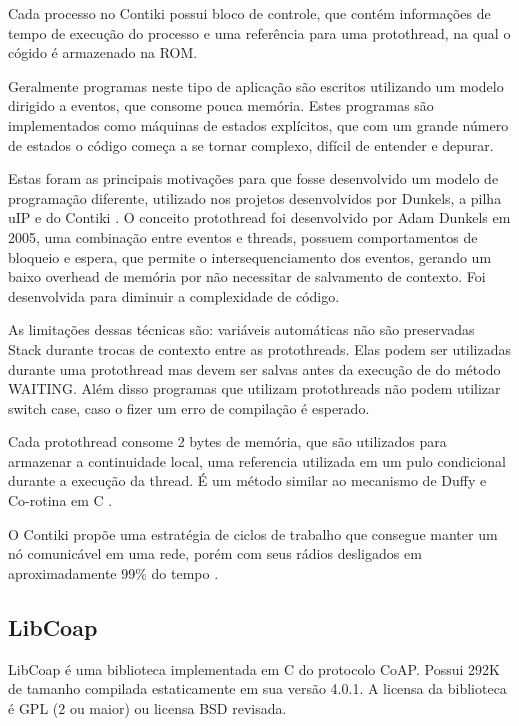 Cada processo no Contiki possui bloco de controle, que cont\'em informa\c{c}\~oes de tempo de execu\c{c}\~ao do processo e uma refer\^encia para uma protothread, na qual o c\'ogido \'e armazenado na ROM. 

Geralmente programas neste tipo de aplica\c{c}\~ao s\~ao escritos utilizando um modelo dirigido a eventos, que consome pouca mem\'oria. Estes programas s\~ao implementados como m\'aquinas de estados expl\'icitos, que com um grande n\'umero de estados o c\'odigo come\c{c}a a se tornar complexo, dif\'icil de entender e depurar.

Estas foram as principais motiva\c{c}\~oes para que fosse desenvolvido um modelo de programa\c{c}\~ao diferente, utilizado nos projetos desenvolvidos por Dunkels, a pilha uIP e do Contiki \cite{Dunkels05protothreads}. O conceito protothread foi desenvolvido por Adam Dunkels em 2005, uma combina\c{c}\~ao entre eventos e threads, possuem comportamentos de bloqueio e espera, que permite o intersequenciamento dos eventos, gerando um baixo overhead de mem\'oria por n\~ao necessitar de salvamento de contexto. Foi desenvolvida para diminuir a complexidade de c\'odigo.

As limita\c{c}\~oes dessas t\'ecnicas s\~ao: vari\'aveis autom\'aticas n\~ao s\~ao preservadas Stack durante trocas de contexto entre as protothreads. Elas podem ser utilizadas durante uma protothread mas devem ser salvas antes da execu\c{c}\~ao de do m\'etodo WAITING. Al\'em disso programas que utilizam protothreads n\~ao podem utilizar switch case, caso o fizer um erro de compila\c{c}\~ao \'e esperado.

Cada protothread consome 2 bytes de mem\'oria, que s\~ao utilizados para armazenar a continuidade local, uma referencia utilizada em um pulo condicional durante a execu\c{c}\~ao da thread. \'E um m\'etodo similar ao mecanismo de Duffy e Co-rotina em C \cite{duffyMechanism}.

O Contiki prop\~oe uma estrat\'egia de ciclos de trabalho que consegue manter um n\'o comunic\'avel em uma rede, por\'em com seus r\'adios desligados em aproximadamente 99\% do tempo \cite{Dunkels11thecontikimac}.

\subsection{LibCoap}
LibCoap \'e uma biblioteca implementada em C do protocolo CoAP. Possui 292K de tamanho compilada estaticamente em sua vers\~ao 4.0.1.
A licensa da biblioteca \'e GPL (2 ou maior) ou licensa BSD revisada.

